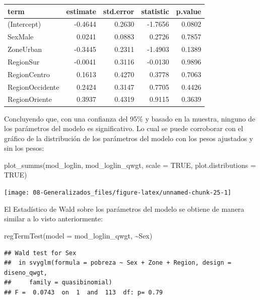 \documentclass[
  12pt,
]{book}
\newenvironment{Shaded}{\begin{snugshade}}{\end{snugshade}}
\newcommand{\AttributeTok}[1]{\textcolor[rgb]{0.77,0.63,0.00}{#1}}
\newcommand{\ConstantTok}[1]{\textcolor[rgb]{0.00,0.00,0.00}{#1}}
\newcommand{\FunctionTok}[1]{\textcolor[rgb]{0.00,0.00,0.00}{#1}}
\newcommand{\NormalTok}[1]{#1}
\newcommand{\SpecialCharTok}[1]{\textcolor[rgb]{0.00,0.00,0.00}{#1}}
\begin{document}
\begin{tabular}{l|r|r|r|r}
\hline
term & estimate & std.error & statistic & p.value\\
\hline
(Intercept) & -0.4644 & 0.2630 & -1.7656 & 0.0802\\
\hline
SexMale & 0.0241 & 0.0883 & 0.2726 & 0.7857\\
\hline
ZoneUrban & -0.3445 & 0.2311 & -1.4903 & 0.1389\\
\hline
RegionSur & -0.0041 & 0.3116 & -0.0130 & 0.9896\\
\hline
RegionCentro & 0.1613 & 0.4270 & 0.3778 & 0.7063\\
\hline
RegionOccidente & 0.2424 & 0.3147 & 0.7705 & 0.4426\\
\hline
RegionOriente & 0.3937 & 0.4319 & 0.9115 & 0.3639\\
\hline
\end{tabular}

Concluyendo que, con una confianza del 95\% y basado en la muestra, ninguno de los parámetros del modelo es significativo. Lo cual se puede corroborar con el gráfico de la distribución de los parámetros del modelo con los pesos ajustados y sin los pesos:

\begin{Shaded}
\begin{Highlighting}[]
\FunctionTok{plot\_summs}\NormalTok{(mod\_loglin, mod\_loglin\_qwgt, }
             \AttributeTok{scale =} \ConstantTok{TRUE}\NormalTok{, }\AttributeTok{plot.distributions =} \ConstantTok{TRUE}\NormalTok{)}
\end{Highlighting}
\end{Shaded}

\texttt{[image: 08-Generalizados\_files/figure-latex/unnamed-chunk-25-1]}

El Estadístico de Wald sobre los parámetros del modelo se obtiene de manera similar a lo visto anteriormente:

\begin{Shaded}
\begin{Highlighting}[]
\FunctionTok{regTermTest}\NormalTok{(}\AttributeTok{model =}\NormalTok{ mod\_loglin\_qwgt, }\SpecialCharTok{\textasciitilde{}}\NormalTok{Sex)}
\end{Highlighting}
\end{Shaded}

\begin{verbatim}
## Wald test for Sex
##  in svyglm(formula = pobreza ~ Sex + Zone + Region, design = diseno_qwgt, 
##     family = quasibinomial)
## F =  0.0743  on  1  and  113  df: p= 0.79
\end{verbatim}
\end{document}
